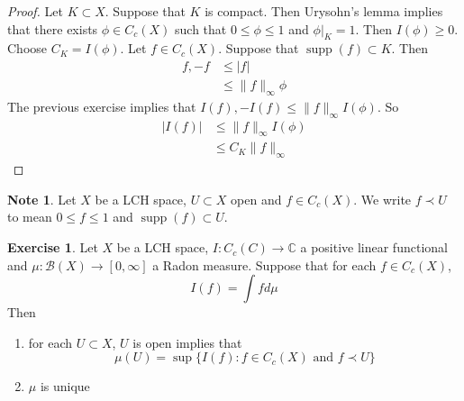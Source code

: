 \documentclass[12pt]{amsart}
\theoremstyle{definition}
\newtheorem{note}[definition]{Note}
\newtheorem{ex}[definition]{Exercise}
\newcommand{\C}{\mathbb{C}}
\newcommand{\MB}{\mathcal{B}}
\newcommand{\RG}{[0,\infty]}
\DeclareMathOperator{\supp}{supp}
\newcommand{\lex}[1]{\label{ex:#1}}
\begin{document}
	\begin{proof}
	Let $K \subset X$. Suppose that $K$ is compact. Then Urysohn's lemma implies that there exists $\phi \in C_c(X)$ such that $0 \leq \phi \leq 1$ and $\phi|_K = 1$. Then $I(\phi) \geq 0$. Choose $C_K = I(\phi)$. Let $f \in C_c(X)$. Suppose that $\supp(f) \subset K$. Then 
	\begin{align*}
	f,-f 
	&\leq |f| \\
	& \leq \|f\|_{\infty} \phi
	\end{align*}
	The previous exercise implies that $I(f), -I(f) \leq \|f\|_{\infty} I(\phi)$. So 
	\begin{align*}
	|I(f)| 
	&\leq \|f\|_{\infty} I(\phi) \\
	&\leq  C_K \|f\|_{\infty}  
	\end{align*}
	\end{proof}
	
	\begin{note}
	Let $X$ be a LCH space, $U \subset X$ open and $f \in C_c(X)$. We write $f \prec U$ to mean $0 \leq f \leq 1$ and $\supp(f) \subset U$. 
	\end{note}
	
	\begin{ex} \lex{00000} 
	Let $X$ be a LCH space, $I: C_c(C) \rightarrow \C$ a positive linear functional and $\mu:\MB(X) \rightarrow \RG$ a Radon measure. Suppose that for each $f \in C_c(X)$, $$I(f) = \int f d\mu$$
	Then 
	\begin{enumerate}
	\item for each $U \subset X$, $U$ is open implies that $$\mu(U) = \sup \{I(f): f \in C_c(X) \text{ and } f \prec U \}$$ 
	\item $\mu$ is unique
\end{enumerate}	 
	\end{ex}
	
\end{document}
